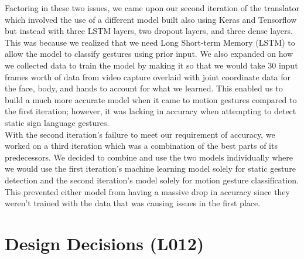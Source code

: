 \documentclass[12pt, titlepage]{article}
\begin{document}
\noindent Factoring in these two issues, we came upon our second iteration of the translator which involved the use of a different model built also using Keras and Tensorflow but instead with three LSTM layers, two dropout layers, and three dense layers. This was because we realized that we need Long Short-term Memory (LSTM) to allow the model to classify gestures using prior input. We also expanded on how we collected data to train the model by making it so that we would take 30 input frames worth of data from video capture overlaid with joint coordinate data for the face, body, and hands to account for what we learned. This enabled us to build a much more accurate model when it came to motion gestures compared to the first iteration; however, it was lacking in accuracy when attempting to detect static sign language gestures.\\

\noindent With the second iteration’s failure to meet our requirement of accuracy, we worked on a third iteration which was a combination of the best parts of its predecessors. We decided to combine and use the two models individually where we would use the first iteration’s machine learning model solely for static gesture detection and the second iteration’s model solely for motion gesture classification. This prevented either model from having a massive drop in accuracy since they weren’t trained with the data that was causing issues in the first place. \\


\section{Design Decisions (L012)}
\end{document}
